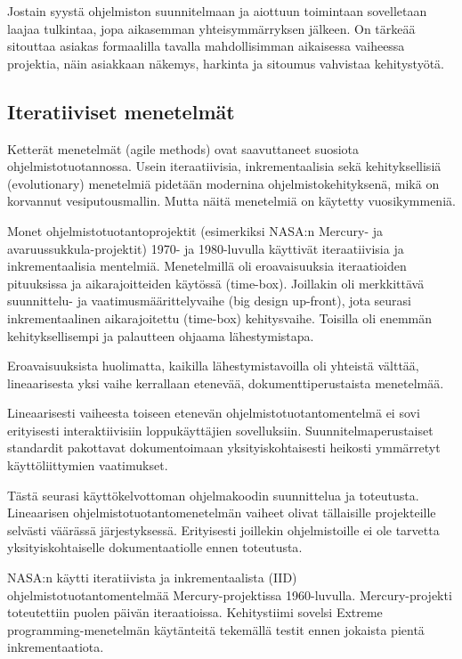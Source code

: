 \documentclass[finnish]{tktltiki2}
\theoremstyle{definition}
\theoremstyle{remark}
\begin{document}
Jostain syystä ohjelmiston suunnitelmaan ja aiottuun toimintaan sovelletaan laajaa tulkintaa, jopa aikasemman yhteisymmärryksen jälkeen. On tärkeää sitouttaa asiakas formaalilla tavalla mahdollisimman aikaisessa vaiheessa projektia, näin asiakkaan näkemys, harkinta ja sitoumus vahvistaa kehitystyötä\cite{ROY70}. 	  


\subsection{Iteratiiviset menetelmät}

Ketterät menetelmät (agile methods) ovat saavuttaneet suosiota ohjelmistotuotannossa. Usein iteraatiivisia, inkrementaalisia sekä kehityksellisiä (evolutionary) menetelmiä pidetään modernina ohjelmistokehityksenä, mikä on korvannut vesiputousmallin. Mutta näitä menetelmiä on käytetty vuosikymmeniä\cite{LAB03}.

Monet ohjelmistotuotantoprojektit  (esimerkiksi NASA:n Mercury- ja avaruussukkula-projektit) 1970- ja 1980-luvulla käyttivät iteraatiivisia ja inkrementaalisia mentelmiä.  Menetelmillä oli eroavaisuuksia iteraatioiden pituuksissa ja aikarajoitteiden käytössä (time-box). Joillakin oli merkkittävä suunnittelu- ja vaatimusmäärittelyvaihe (big design up-front), jota seurasi inkrementaalinen aikarajoitettu (time-box) kehitysvaihe. Toisilla oli enemmän kehityksellisempi ja palautteen ohjaama lähestymistapa\cite{LAB03}.

Eroavaisuuksista huolimatta, kaikilla lähestymistavoilla oli yhteistä välttää, lineaarisesta yksi vaihe kerrallaan etenevää, dokumenttiperustaista menetelmää\cite{LAB03}.

Lineaarisesti vaiheesta toiseen etenevän ohjelmistotuotantomentelmä ei sovi erityisesti interaktiivisiin loppukäyttäjien sovelluksiin. Suunnitelmaperustaiset standardit pakottavat dokumentoimaan yksityiskohtaisesti heikosti ymmärretyt käyttöliittymien vaatimukset\cite{BOE88}.

Tästä seurasi käyttökelvottoman ohjelmakoodin suunnittelua ja toteutusta. Lineaarisen ohjelmistotuotantomenetelmän vaiheet olivat tällaisille projekteille selvästi väärässä järjestyksessä. Erityisesti joillekin ohjelmistoille ei ole tarvetta yksityiskohtaiselle dokumentaatiolle ennen toteutusta\cite{BOE88}.

NASA:n käytti iteratiivista ja inkrementaalista (IID) ohjelmistotuotantomentelmää Mercury-projektissa 1960-luvulla. Mercury-projekti toteutettiin puolen päivän iteraatioissa. Kehitystiimi sovelsi Extreme programming-menetelmän käytänteitä tekemällä testit ennen jokaista pientä inkremen\-taatiota\cite{LAB03}.
\end{document}

